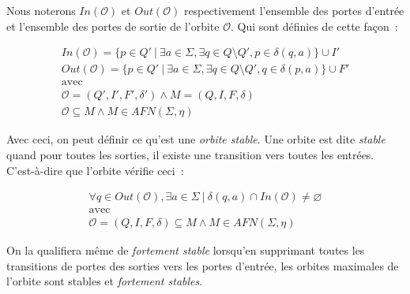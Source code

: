 \begin{definition}
    Nous noterons \(In(\mathcal{O})\) et \(Out(\mathcal{O})\) respectivement
    l'ensemble des portes d'entrée et l'ensemble des portes de sortie de
    l'orbite \(\mathcal{O}\). Qui sont définies de cette façon~:

    \begin{gather*}
        In(\mathcal{O}) = \{p \in Q' ~|~ \exists a \in \Sigma, \exists q \in Q
        \setminus Q', p \in \delta(q, a)\} \cup I'\\
        Out(\mathcal{O}) = \{p \in Q' ~|~ \exists a \in \Sigma, \exists q \in Q
        \setminus Q', q \in \delta(p, a)\} \cup F'\\
        \text{avec} \\
        \mathcal{O} = (Q', I', F', \delta') \land M = (Q, I, F, \delta) \\
        \mathcal{O} \subseteq M \land M \in AFN(\Sigma, \eta)
    \end{gather*}
\end{definition}

\begin{definition}
    Avec ceci, on peut définir ce qu'est une \textit{orbite stable}. Une orbite
    est dite \textit{stable} quand pour toutes les sorties, il existe une
    transition vers toutes les entrées. C'est-à-dire que l'orbite vérifie
    ceci~:

    \begin{gather*}
        \forall q \in Out(\mathcal{O}), \exists a \in \Sigma ~|~ \delta(q, a) \cap In(\mathcal{O}) \neq \varnothing \\
        \text{avec} \\
        \mathcal{O} = (Q, I, F, \delta) \subseteq M \land M \in AFN(\Sigma, \eta)
    \end{gather*}

    \noindent On la qualifiera même de \textit{fortement stable} lorsqu'en
    supprimant toutes les transitions de portes des sorties vers les portes
    d'entrée, les orbites maximales de l'orbite sont stables et
    \textit{fortement stables}.
\end{definition}

